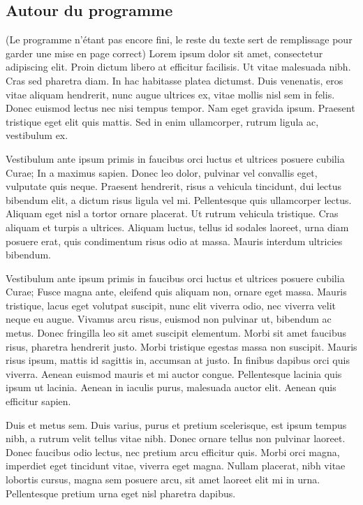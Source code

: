 \documentclass[final]{beamer}
\begin{document}
\begin{frame}[t]
\begin{multicols}{3}
\section{Autour du programme}
(Le programme n'étant pas encore fini, le reste du texte sert de remplissage pour garder une mise en page correct) Lorem ipsum dolor sit amet, consectetur adipiscing elit. Proin dictum libero at efficitur facilisis. Ut vitae malesuada nibh. Cras sed pharetra diam. In hac habitasse platea dictumst. Duis venenatis, eros vitae aliquam hendrerit, nunc augue ultrices ex, vitae mollis nisl sem in felis. Donec euismod lectus nec nisi tempus tempor. Nam eget gravida ipsum. Praesent tristique eget elit quis mattis. Sed in enim ullamcorper, rutrum ligula ac, vestibulum ex.

Vestibulum ante ipsum primis in faucibus orci luctus et ultrices posuere cubilia Curae; In a maximus sapien. Donec leo dolor, pulvinar vel convallis eget, vulputate quis neque. Praesent hendrerit, risus a vehicula tincidunt, dui lectus bibendum elit, a dictum risus ligula vel mi. Pellentesque quis ullamcorper lectus. Aliquam eget nisl a tortor ornare placerat. Ut rutrum vehicula tristique. Cras aliquam et turpis a ultrices. Aliquam luctus, tellus id sodales laoreet, urna diam posuere erat, quis condimentum risus odio at massa. Mauris interdum ultricies bibendum.

Vestibulum ante ipsum primis in faucibus orci luctus et ultrices posuere cubilia Curae; Fusce magna ante, eleifend quis aliquam non, ornare eget massa. Mauris tristique, lacus eget volutpat suscipit, nunc elit viverra odio, nec viverra velit neque eu augue. Vivamus arcu risus, euismod non pulvinar ut, bibendum ac metus. Donec fringilla leo sit amet suscipit elementum. Morbi sit amet faucibus risus, pharetra hendrerit justo. Morbi tristique egestas massa non suscipit. Mauris risus ipsum, mattis id sagittis in, accumsan at justo. In finibus dapibus orci quis viverra. Aenean euismod mauris et mi auctor congue. Pellentesque lacinia quis ipsum ut lacinia. Aenean in iaculis purus, malesuada auctor elit. Aenean quis efficitur sapien.

Duis et metus sem. Duis varius, purus et pretium scelerisque, est ipsum tempus nibh, a rutrum velit tellus vitae nibh. Donec ornare tellus non pulvinar laoreet. Donec faucibus odio lectus, nec pretium arcu efficitur quis. Morbi orci magna, imperdiet eget tincidunt vitae, viverra eget magna. Nullam placerat, nibh vitae lobortis cursus, magna sem posuere arcu, sit amet laoreet elit mi in urna. Pellentesque pretium urna eget nisl pharetra dapibus.




\end{multicols}
\end{frame}
\end{document}

